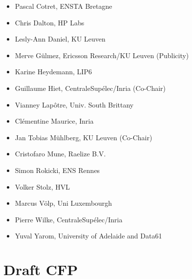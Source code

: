 \documentclass[a4paper,11pt]{article}
\begin{document}

\begin{itemize}
    \item Pascal Cotret, ENSTA Bretagne
    \item Chris Dalton, HP Labs
    \item{Lesly-Ann Daniel, KU Leuven}
    \item{Merve G\"ulmez, Ericsson Research/KU Leuven (Publicity)}
    \item Karine Heydemann, LIP6
    \item Guillaume Hiet, CentraleSupélec/Inria (Co-Chair)
    \item Vianney Lap\^otre, Univ. South Brittany
    \item{Cl\'ementine Maurice, Inria}
    \item Jan Tobias M\"uhlberg, KU Leuven (Co-Chair)
    \item Cristofaro Mune, Raelize B.V.
    \item Simon Rokicki, ENS Rennes
    \item Volker Stolz, HVL
    \item{Marcus V\"olp, Uni Luxembourgh}
    \item Pierre Wilke, CentraleSup\'elec/Inria
    \item Yuval Yarom, University of Adelaide and Data61
\end{itemize}


\section{Draft CFP}
%

\end{document}
